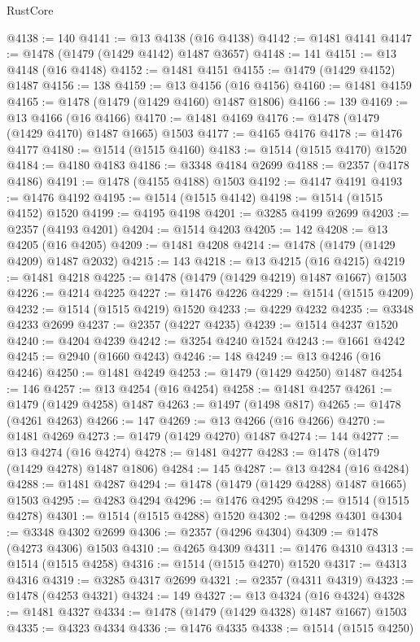 \begin{lexlean}{RustCore}
\begin{coremodule}
@4138 := 140
@4141 := @13 @4138 (@16 @4138)
@4142 := @1481 @4141
@4147 := @1478 (@1479 (@1429 @4142) @1487 @3657)
@4148 := 141
@4151 := @13 @4148 (@16 @4148)
@4152 := @1481 @4151
@4155 := @1479 (@1429 @4152) @1487
@4156 := 138
@4159 := @13 @4156 (@16 @4156)
@4160 := @1481 @4159
@4165 := @1478 (@1479 (@1429 @4160) @1487 @1806)
@4166 := 139
@4169 := @13 @4166 (@16 @4166)
@4170 := @1481 @4169
@4176 := @1478 (@1479 (@1429 @4170) @1487 @1665) @1503
@4177 := @4165 @4176
@4178 := @1476 @4177
@4180 := @1514 (@1515 @4160)
@4183 := @1514 (@1515 @4170) @1520
@4184 := @4180 @4183
@4186 := @3348 @4184 @2699
@4188 := @2357 (@4178 @4186)
@4191 := @1478 (@4155 @4188) @1503
@4192 := @4147 @4191
@4193 := @1476 @4192
@4195 := @1514 (@1515 @4142)
@4198 := @1514 (@1515 @4152) @1520
@4199 := @4195 @4198
@4201 := @3285 @4199 @2699
@4203 := @2357 (@4193 @4201)
@4204 := @1514 @4203
@4205 := 142
@4208 := @13 @4205 (@16 @4205)
@4209 := @1481 @4208
@4214 := @1478 (@1479 (@1429 @4209) @1487 @2032)
@4215 := 143
@4218 := @13 @4215 (@16 @4215)
@4219 := @1481 @4218
@4225 := @1478 (@1479 (@1429 @4219) @1487 @1667) @1503
@4226 := @4214 @4225
@4227 := @1476 @4226
@4229 := @1514 (@1515 @4209)
@4232 := @1514 (@1515 @4219) @1520
@4233 := @4229 @4232
@4235 := @3348 @4233 @2699
@4237 := @2357 (@4227 @4235)
@4239 := @1514 @4237 @1520
@4240 := @4204 @4239
@4242 := @3254 @4240 @1524
@4243 := @1661 @4242
@4245 := @2940 (@1660 @4243)
@4246 := 148
@4249 := @13 @4246 (@16 @4246)
@4250 := @1481 @4249
@4253 := @1479 (@1429 @4250) @1487
@4254 := 146
@4257 := @13 @4254 (@16 @4254)
@4258 := @1481 @4257
@4261 := @1479 (@1429 @4258) @1487
@4263 := @1497 (@1498 @817)
@4265 := @1478 (@4261 @4263)
@4266 := 147
@4269 := @13 @4266 (@16 @4266)
@4270 := @1481 @4269
@4273 := @1479 (@1429 @4270) @1487
@4274 := 144
@4277 := @13 @4274 (@16 @4274)
@4278 := @1481 @4277
@4283 := @1478 (@1479 (@1429 @4278) @1487 @1806)
@4284 := 145
@4287 := @13 @4284 (@16 @4284)
@4288 := @1481 @4287
@4294 := @1478 (@1479 (@1429 @4288) @1487 @1665) @1503
@4295 := @4283 @4294
@4296 := @1476 @4295
@4298 := @1514 (@1515 @4278)
@4301 := @1514 (@1515 @4288) @1520
@4302 := @4298 @4301
@4304 := @3348 @4302 @2699
@4306 := @2357 (@4296 @4304)
@4309 := @1478 (@4273 @4306) @1503
@4310 := @4265 @4309
@4311 := @1476 @4310
@4313 := @1514 (@1515 @4258)
@4316 := @1514 (@1515 @4270) @1520
@4317 := @4313 @4316
@4319 := @3285 @4317 @2699
@4321 := @2357 (@4311 @4319)
@4323 := @1478 (@4253 @4321)
@4324 := 149
@4327 := @13 @4324 (@16 @4324)
@4328 := @1481 @4327
@4334 := @1478 (@1479 (@1429 @4328) @1487 @1667) @1503
@4335 := @4323 @4334
@4336 := @1476 @4335
@4338 := @1514 (@1515 @4250)

\end{coremodule}
\end{lexlean}

